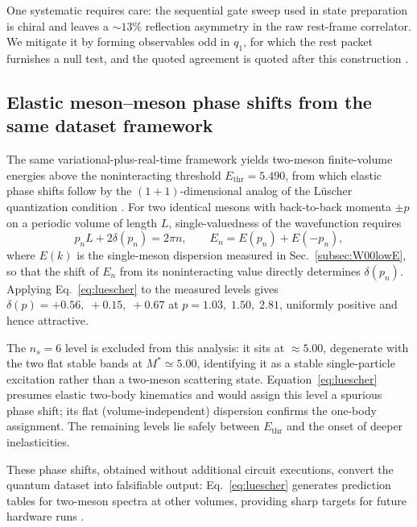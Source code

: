 One systematic requires care: the sequential gate sweep used in state preparation is chiral and leaves a ${\sim}13\%$ reflection asymmetry in the raw rest-frame correlator. We mitigate it by forming observables odd in $q_{1}$, for which the rest packet furnishes a null test, and the quoted agreement is quoted after this construction \cite{placeholder}.

\subsection{Elastic meson--meson phase shifts from the same dataset framework}
\label{subsec:phaseshifts}

The same variational-plus-real-time framework yields two-meson finite-volume energies above the noninteracting threshold $E_{\mathrm{thr}}=5.490$, from which elastic phase shifts follow by the $(1{+}1)$-dimensional analog of the L\"uscher quantization condition \cite{placeholder}. For two identical mesons with back-to-back momenta $\pm p$ on a periodic volume of length $L$, single-valuedness of the wavefunction requires
\begin{equation}
p_{n}L+2\delta(p_{n})=2\pi n,\qquad E_{n}=E(p_{n})+E(-p_{n}),
\label{eq:luescher}
\end{equation}
where $E(k)$ is the single-meson dispersion measured in Sec.~\ref{subsec:W00lowE}, so that the shift of $E_{n}$ from its noninteracting value directly determines $\delta(p_{n})$. Applying Eq.~\eqref{eq:luescher} to the measured levels gives
$\delta(p)=+0.56,\;+0.15,\;+0.67$ at $p=1.03,\;1.50,\;2.81$, uniformly positive and hence attractive.

The $n_{s}=6$ level is excluded from this analysis: it sits at ${\approx}5.00$, degenerate with the two flat stable bands at $M^{*}\simeq5.00$, identifying it as a stable single-particle excitation rather than a two-meson scattering state. Equation~\eqref{eq:luescher} presumes elastic two-body kinematics and would assign this level a spurious phase shift; its flat (volume-independent) dispersion confirms the one-body assignment. The remaining levels lie safely between $E_{\mathrm{thr}}$ and the onset of deeper inelasticities.

These phase shifts, obtained without additional circuit executions, convert the quantum dataset into falsifiable output: Eq.~\eqref{eq:luescher} generates prediction tables for two-meson spectra at other volumes, providing sharp targets for future hardware runs \cite{placeholder}.
